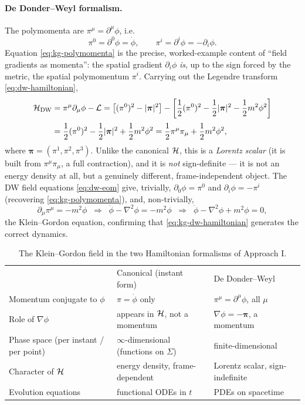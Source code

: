 \paragraph{De Donder--Weyl formalism.} The polymomenta are 
$\pi^\mu = \partial^\mu\phi$, i.e.
\begin{equation}
\pi^0 = \partial^0\phi = \dot\phi, \qquad \pi^i = \partial^i\phi = -\partial_i\phi .
\label{eq:kg-polymomenta}
\end{equation}
Equation \eqref{eq:kg-polymomenta} is the precise, worked-example content of
``field gradients as momenta'': the spatial gradient $\partial_i\phi$
\emph{is}, up to the sign forced by the metric, the spatial polymomentum
$\pi^i$. Carrying out the Legendre transform \eqref{eq:dw-hamiltonian},
\begin{align}
\mathcal{H}_{\mathrm{DW}} &= \pi^\mu\partial_\mu\phi - \mathcal{L}
= \big[(\pi^0)^2 - |\boldsymbol\pi|^2\big] - \left[\frac12(\pi^0)^2-
    \frac12|\boldsymbol\pi|^2-\frac12 m^2\phi^2\right] \notag\\[2pt]
&= \frac{1}{2}(\pi^0)^2 - \frac{1}{2}|\boldsymbol\pi|^2 + 
    \frac{1}{2}m^2\phi^2
= \frac{1}{2}\pi^\mu\pi_\mu + \frac{1}{2}m^2\phi^2 ,
\label{eq:kg-dw-hamiltonian}
\end{align}
where $\boldsymbol\pi=(\pi^1,\pi^2,\pi^3)$. Unlike the canonical $\mathcal{H}$, this
is a \emph{Lorentz scalar} (it is built from $\pi^\mu\pi_\mu$, a full
contraction), and it is \emph{not} sign-definite --- it is not an energy
density at all, but a genuinely different, frame-independent object. The DW
field equations \eqref{eq:dw-eom} give, trivially, $\partial_0\phi=\pi^0$ and
$\partial_i\phi=-\pi^i$ (recovering \eqref{eq:kg-polymomenta}), and,
non-trivially,
\begin{equation}
\partial_\mu\pi^\mu = -m^2\phi
\;\;\Longrightarrow\;\;
\ddot\phi - \nabla^2\phi = -m^2\phi
\;\;\Longrightarrow\;\;
\ddot\phi-\nabla^2\phi+m^2\phi = 0,
\end{equation}
the Klein--Gordon equation, confirming that \eqref{eq:kg-dw-hamiltonian}
generates the correct dynamics.

\begin{table}[h]
\centering
\begin{tabular}{@{}lll@{}}
 & Canonical (instant form) & De Donder--Weyl \\
Momentum conjugate to $\phi$ & $\pi=\dot\phi$ only & $\pi^\mu=\partial^\mu\phi$, all $\mu$ \\
Role of $\nabla\phi$ & appears in $\mathcal{H}$, not a momentum & $\nabla\phi = -\boldsymbol\pi$, a momentum \\
Phase space (per instant / per point) & $\infty$-dimensional (functions on $\Sigma$) & finite-dimensional \\
Character of $\mathcal{H}$ & energy density, frame-dependent & Lorentz scalar, sign-indefinite \\
Evolution equations & functional ODEs in $t$ & PDEs on spacetime \\
\end{tabular}
\caption{The Klein--Gordon field in the two Hamiltonian formalisms of Approach I.}
\end{table}


